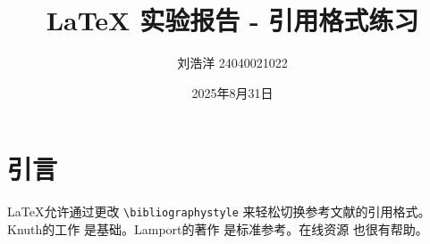 \documentclass{article}
\title{LaTeX 实验报告 - 引用格式练习}
\author{刘浩洋 24040021022}
\date{2025年8月31日}
\begin{document}
\maketitle

\section{引言}
LaTeX允许通过更改 \texttt{\textbackslash bibliographystyle} 来轻松切换参考文献的引用格式。Knuth的工作 \cite{knuth1984} 是基础。Lamport的著作 \cite{lamport1994} 是标准参考。在线资源 \cite{wiki2025} 也很有帮助。

\nocite{book2020} 


\end{document}
